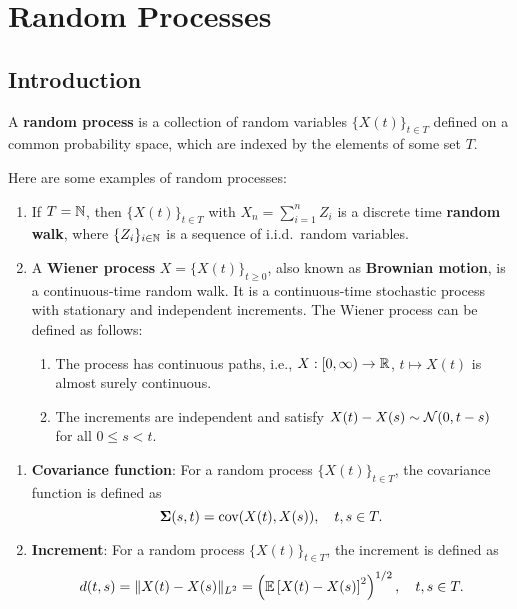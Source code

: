 \chapter{Random Processes}

\section{Introduction}

\begin{definition}
	A \textbf{random process} is a collection of random variables \(\{X(t)\}_{t\in T}\) defined on a common probability space, which are indexed by the elements of some set \(T\).
\end{definition}

\begin{example}
	Here are some examples of random processes:
	\begin{enumerate}
		\item If \(T=\mathbb{N}\), then \(\{X(t)\}_{t\in T}\) with \(X_{n}=\sum_{i=1}^{n}Z_{i}\) is a discrete time \textbf{random walk}, where \(\{Z_{i}\}_{i\in\mathbb{N}}\) is a sequence of i.i.d.\ random variables.
		\item A \textbf{Wiener process} \(X=\{X(t)\}_{t\geq 0}\), also known as \textbf{Brownian motion}, is a continuous-time random walk. It is a continuous-time stochastic process with stationary and independent increments. The Wiener process can be defined as follows:
		      \begin{enumerate}
			      \item The process has continuous paths, i.e., \(X:[0,\infty)\to\mathbb{R}\), \(t\mapsto X(t)\) is almost surely continuous.
			      \item The increments are independent and satisfy \(X(t)-X(s)\sim\mathcal{N}(0,t-s)\) for all \(0\leq s<t\).
		      \end{enumerate}
	\end{enumerate}
\end{example}

\begin{definition}
	\begin{enumerate}
		\item \textbf{Covariance function}: For a random process \(\{X(t)\}_{t\in T}\), the covariance function is defined as
		      \begin{equation}
			      \boldsymbol{\Sigma}(s,t)=\operatorname{cov}(X(t),X(s)),\quad t,s\in T.
		      \end{equation}
		\item \textbf{Increment}: For a random process \(\{X(t)\}_{t\in T}\), the increment is defined as
		      \begin{equation}
			      d(t,s)=\|X(t)-X(s)\|_{L^{2}}=\left(\mathbb{E}\left[X(t)-X(s)\right]^{2}\right)^{1/2},\quad t,s\in T.
		      \end{equation}
	\end{enumerate}
\end{definition}

